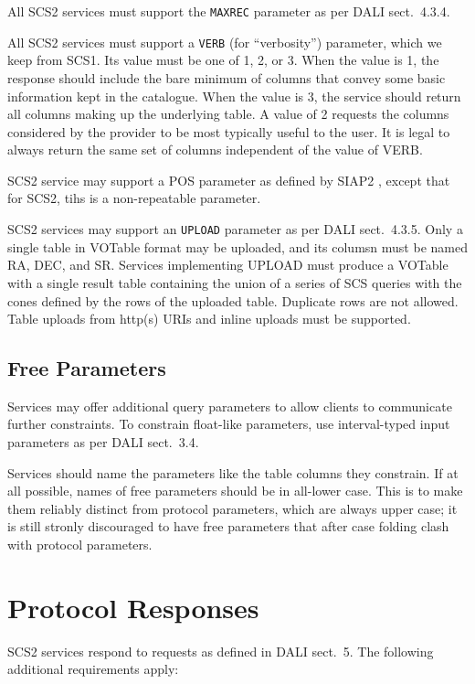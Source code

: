 \documentclass[11pt,a4paper]{ivoa}
\begin{document}
\begin{bigdescription}
All SCS2 services must support the \verb|MAXREC| parameter as per DALI
sect.~4.3.4.

All SCS2 services must support a \verb|VERB| (for ``verbosity'')
parameter, which we keep from SCS1.  Its value must be one of 1, 2, or
3.  When the value is 1, the response should include the bare minimum of
columns that convey some basic information kept in the catalogue.  When
the value is 3, the service should return all columns making up the
underlying table.  A value of 2 requests the columns considered by the
provider to be most typically useful to the user.   It is legal to
always return the same set of columns independent of the value of VERB.

SCS2 service may support a POS parameter as defined by SIAP2
\citep{2015ivoa.spec.1223D}, except that for SCS2, tihs is a
non-repeatable parameter.

SCS2 services may support an \texttt{UPLOAD} parameter as per DALI
sect.~4.3.5.  Only a single table in VOTable format may be uploaded, and
its columsn must be named RA, DEC, and SR.  Services implementing UPLOAD
must produce a VOTable with a single result table containing the union
of a series of SCS queries with the cones defined by the rows of the
uploaded table.  Duplicate rows are not allowed.  Table uploads from
http(s) URIs and inline uploads must be supported.

\subsection{Free Parameters}

Services may offer additional query parameters to allow clients to
communicate further constraints.  To constrain float-like parameters,
use interval-typed input parameters as per DALI sect.~3.4.

Services should name the parameters like the table columns they
constrain.  If at all possible, names of free parameters should be in
all-lower case.  This is to make them reliably distinct from protocol
parameters, which are always upper case; it is still stronly discouraged
to have free parameters that after case folding clash with protocol
parameters.


\section{Protocol Responses}

SCS2 services respond to requests as defined in DALI sect.~5.  The
following additional requirements apply:


\end{bigdescription}
\end{document}
